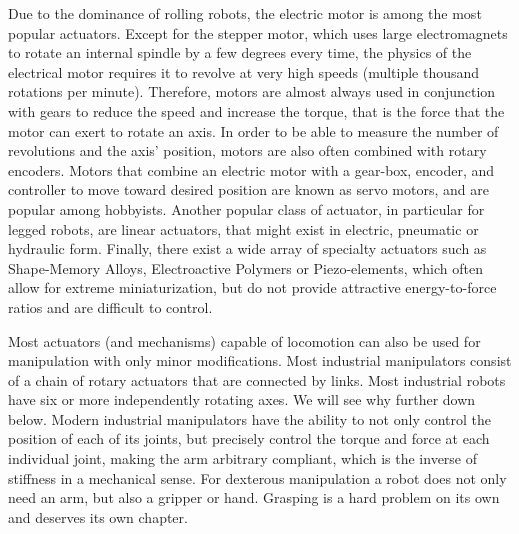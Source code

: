 Due to the dominance of rolling robots, the electric motor is among the most popular actuators. Except for the stepper motor, which uses large electromagnets to rotate an internal spindle by a few degrees every time, the physics of the electrical motor requires it to revolve at very high speeds (multiple thousand rotations per minute). Therefore, motors are almost always used in conjunction with gears to reduce the speed and increase the torque, that is the force that the motor can exert to rotate an axis. In order to be able to measure the number of revolutions and the axis' position, motors are also often combined with rotary encoders. Motors that combine an electric motor with a gear-box, encoder, and controller to move toward desired position are known as servo motors, and are popular among hobbyists. Another popular class of actuator, in particular for legged robots, are linear actuators, that might exist in electric, pneumatic or hydraulic form. Finally, there exist a wide array of specialty actuators such as Shape-Memory Alloys, Electroactive Polymers or Piezo-elements, which often allow for extreme miniaturization, but do not provide attractive energy-to-force ratios and are difficult to control.

Most actuators (and mechanisms) capable of locomotion can also be used for manipulation with only minor modifications. Most industrial manipulators consist of a chain of rotary actuators that are connected by links. Most industrial robots have six or more independently rotating axes. We will see why further down below. Modern industrial manipulators have the ability to not only control the position of each of its joints, but precisely control the torque and force at each individual joint, making the arm arbitrary compliant, which is the inverse of stiffness in a mechanical sense. For dexterous manipulation a robot does not only need an arm, but also a gripper or hand. Grasping is a hard problem on its own and deserves its own chapter. 


